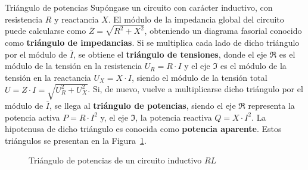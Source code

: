 \documentclass[11pt]{book} %
\makeatletter
\numberwithin{dummy}{section}
\theoremstyle{ocrenumbox}
\theoremstyle{blacknumex}
\theoremstyle{blacknumbox}
\theoremstyle{ocrenum}
\renewcommand{\subsection}{\@startsection {subsection}{2}{\z@}
{-3ex \@plus -0.1ex \@minus -.4ex}
{0.5ex \@plus.2ex }
{\normalfont\sffamily\bfseries}}
\makeatother
\begin{document}
	\subsection{Triángulo de potencias}
	Supóngase un circuito con carácter inductivo, con resistencia $R$ y reactancia $X$. El módulo de la impedancia global del circuito puede calcularse como $\overline{Z}=\sqrt{R^2+X^2}$, obteniendo un diagrama fasorial conocido como \textbf{triángulo de impedancias}. Si se multiplica cada lado de dicho triángulo por el módulo de $\overline{I}$, se obtiene el \textbf{triángulo de tensiones}, donde el eje $\Re$ es el módulo de la tensión en la resistencia $U_R=R\cdot I$ y el eje $\Im$ es el módulo de la tensión en la reactancia $U_X=X\cdot I$, siendo el módulo de la tensión total $U=Z\cdot I=\sqrt{U_R^2+U_X^2}$. Si, de nuevo, vuelve a multiplicarse dicho triángulo por el módulo de $\overline{I}$, se llega al \textbf{triángulo de potencias}, siendo el eje $\Re$ representa la potencia activa $P=R\cdot I^2$ y, el eje $\Im$, la potencia reactiva $Q=X\cdot I^2$. La hipotenusa de dicho triángulo es conocida como \textbf{potencia aparente}. Estos triángulos se presentan en la Figura~\ref{fig.triangulo_potencias}. 
	\begin{figure}[htbp]
		\centering
		\hfill
		\hfill
		\hfil
		\caption{Triángulo de potencias de un circuito inductivo $RL$}
		\label{fig.triangulo_potencias}
	\end{figure}
	
\end{document}
